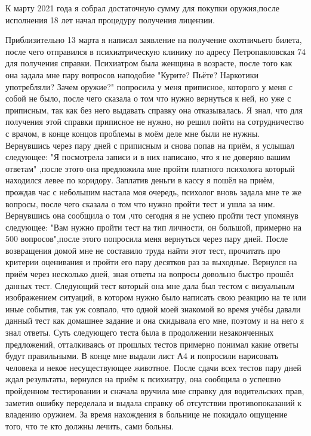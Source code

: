 \begin{itemize}
К марту 2021 года я собрал достаточную сумму для покупки оружия,после
исполнения 18 лет начал процедуру получения лицензии.

Приблизительно 13 марта я написал заявление на получение охотничьего
билета, после чего отправился в психиатрическую клинику по адресу
Петропавловская 74 для получения справки. Психиатром была женщина в возрасте,
после того как она задала мне пару вопросов наподобие "Курите? Пьёте? Наркотики
употребляли? Зачем оружие?" попросила у меня приписное, которого у меня с собой
не было, после чего сказала о том что нужно вернуться к ней, но уже с
приписным, так как без него выдавать справку она отказывалась. Я знал, что для
получения этой справки приписное не нужно, но решил пойти на сотрудничество с
врачом, в конце концов проблемы в моём деле мне были не нужны. Вернувшись через
пару дней с приписным и снова попав на приём, я услышал следующее: "Я посмотрела
записи и в них написано, что я не доверяю вашим ответам" ,после этого она
предложила мне пройти платного психолога который находился левее по
коридору. Заплатив деньги в кассу я пошёл на приём, прождав час с небольшим
настала моя очередь, психолог вновь задала мне те же вопросы, после чего сказала
о том что нужно пройти тест и ушла за ним. Вернувшись она сообщила о том ,что
сегодня я не успею пройти тест упомянув следующее: "Вам нужно пройти тест на
тип личности, он большой, примерно на 500 вопросов",после этого попросила меня
вернуться через пару дней. После возвращения домой мне не составило труда найти
этот тест, прочитать про критерии оценивания и пройти его пару десятков раз за
выходные. Вернулся на приём через несколько дней, зная ответы на вопросы
довольно быстро прошёл данных тест. Следующий тест который она мне дала был
тестом с визуальным изображением ситуаций, в котором нужно было написать свою
реакцию на те или иные события, так уж совпало, что одной моей знакомой во время
учёбы давали данный тест как домашнее задание и она скидывала его мне, поэтому и
на него я знал ответы. Суть следующего теста была в продолжении незаконченных
предложений, отталкиваясь от прошлых тестов примерно понимал какие ответы будут
правильными. В конце мне выдали лист А4 и попросили нарисовать человека и некое
несуществующее животное. После сдачи всех тестов пару дней ждал
результаты, вернулся на приём к психиатру, она сообщила о успешно пройденном
тестировании и сначала вручила мне справку для водительских прав, заметив ошибку
переделала и выдала справку об отсутствии противопоказаний к владению
оружием. За время нахождения в больнице не покидало ощущение того, что те кто
должны лечить, сами больны.


\end{itemize}
